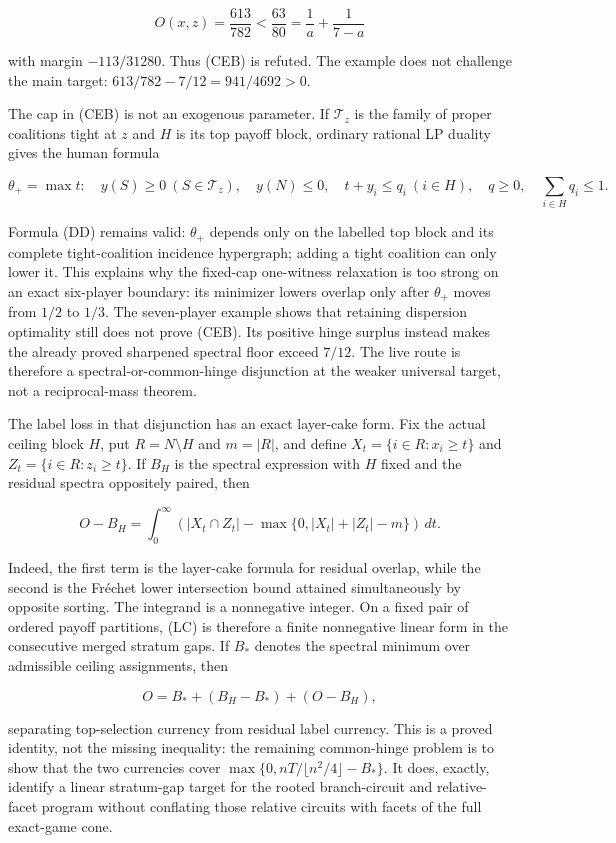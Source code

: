 \documentclass[11pt]{article}
\begin{document}
\[
 O(x,z)=\frac{613}{782}<\frac{63}{80}
       =\frac1a+\frac1{7-a}
\]

with margin $-113/31280$.  Thus (CEB) is refuted.  The example does not
challenge the main target: $613/782-7/12=941/4692>0$.

The cap in (CEB) is not an exogenous parameter.  If $\mathcal T_z$ is the
family of proper coalitions tight at $z$ and $H$ is its top payoff block,
ordinary rational LP duality gives the human formula

\[
 \theta_+=\max t:\quad y(S)\ge0\ (S\in\mathcal T_z),\quad
 y(N)\le0,\quad t+y_i\le q_i\ (i\in H),\quad
 q\ge0,\quad\sum_{i\in H}q_i\le1.                    \tag{DD}
\]

Formula (DD) remains valid: $\theta_+$ depends only on the labelled top block and its complete
tight-coalition incidence hypergraph; adding a tight coalition can only
lower it.  This explains why the fixed-cap one-witness relaxation is too
strong on an exact six-player boundary: its minimizer lowers overlap only
after $\theta_+$ moves from $1/2$ to $1/3$.  The seven-player example shows
that retaining dispersion optimality still does not prove (CEB).  Its
positive hinge surplus instead makes the already proved sharpened spectral
floor exceed $7/12$.  The live route is therefore a spectral-or-common-hinge
disjunction at the weaker universal target, not a reciprocal-mass theorem.

The label loss in that disjunction has an exact layer-cake form.  Fix the
actual ceiling block $H$, put $R=N\setminus H$ and $m=|R|$, and define
$X_t=\{i\in R:x_i\ge t\}$ and $Z_t=\{i\in R:z_i\ge t\}$.  If $B_H$ is the
spectral expression with $H$ fixed and the residual spectra oppositely
paired, then

\[
 O-B_H=\int_0^\infty
 \left(|X_t\cap Z_t|-\max\{0,|X_t|+|Z_t|-m\}\right)\,dt. \tag{LC}
\]

Indeed, the first term is the layer-cake formula for residual overlap, while
the second is the Fr\'echet lower intersection bound attained simultaneously
by opposite sorting.  The integrand is a nonnegative integer.  On a fixed
pair of ordered payoff partitions, (LC) is therefore a finite nonnegative
linear form in the consecutive merged stratum gaps.  If $B_*$ denotes the
spectral minimum over admissible ceiling assignments, then

\[
 O=B_*+(B_H-B_*)+(O-B_H),
\]

separating top-selection currency from residual label currency.  This is a
proved identity, not the missing inequality: the remaining common-hinge
problem is to show that the two currencies cover
$\max\{0,nT/\lfloor n^2/4\rfloor-B_*\}$.  It does, exactly, identify a
linear stratum-gap target for the rooted branch-circuit and relative-facet
program without conflating those relative circuits with facets of the full
exact-game cone.
\end{document}
